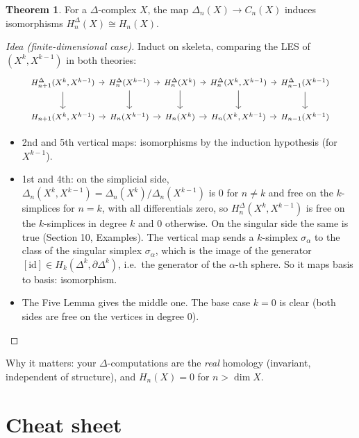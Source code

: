 \documentclass[11pt]{article}
\theoremstyle{definition}
\newtheorem{thm}{Theorem}[section]
\begin{document}
\begin{thm}
For a $\Delta$-complex $X$, the map $\Delta_n(X)\to C_n(X)$ induces isomorphisms $H^\Delta_n(X)\cong H_n(X)$.
\end{thm}
\begin{proof}[Idea (finite-dimensional case)]
Induct on skeleta, comparing the LES of $(X^k,X^{k-1})$ in both theories:
\[\begin{tikzcd}[column sep=tiny,cells={font=\footnotesize}]
H^\Delta_{n+1}(X^k,X^{k-1})\ar[r]\ar[d] & H^\Delta_n(X^{k-1})\ar[r]\ar[d] & H^\Delta_n(X^k)\ar[r]\ar[d] & H^\Delta_n(X^k,X^{k-1})\ar[r]\ar[d] & H^\Delta_{n-1}(X^{k-1})\ar[d]\\
H_{n+1}(X^k,X^{k-1})\ar[r] & H_n(X^{k-1})\ar[r] & H_n(X^k)\ar[r] & H_n(X^k,X^{k-1})\ar[r] & H_{n-1}(X^{k-1})
\end{tikzcd}\]
\begin{itemize}
\item 2nd and 5th vertical maps: isomorphisms by the induction hypothesis (for $X^{k-1}$).
\item 1st and 4th: on the simplicial side, $\Delta_n(X^k,X^{k-1})=\Delta_n(X^k)/\Delta_n(X^{k-1})$ is $0$ for $n\neq k$ and free on the $k$-simplices for $n=k$, with all differentials zero, so $H^\Delta_n(X^k,X^{k-1})$ is free on the $k$-simplices in degree $k$ and $0$ otherwise. On the singular side the same is true (Section 10, Examples). The vertical map sends a $k$-simplex $\sigma_\alpha$ to the class of the singular simplex $\sigma_\alpha$, which is the image of the generator $[\mathrm{id}]\in H_k(\Delta^k,\partial\Delta^k)$, i.e.\ the generator of the $\alpha$-th sphere. So it maps basis to basis: isomorphism.
\item The Five Lemma gives the middle one. The base case $k=0$ is clear (both sides are free on the vertices in degree $0$).
\end{itemize}
\end{proof}
Why it matters: your $\Delta$-computations are the \emph{real} homology (invariant, independent of structure), and $H_n(X)=0$ for $n>\dim X$.

\section{Cheat sheet}
\end{document}
